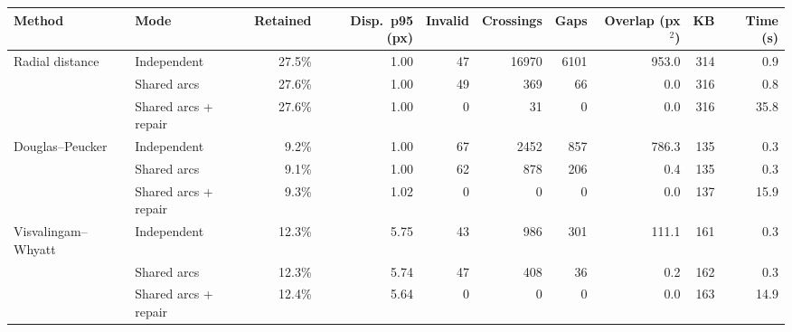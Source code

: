 \begin{tabular}{llrrrrrrrr}
\toprule
Method & Mode & Retained & Disp.\ p95 (px) & Invalid & Crossings & Gaps & Overlap (px$^2$) & KB & Time (s) \\
\midrule
Radial distance & Independent & 27.5\% & 1.00 & 47 & 16970 & 6101 & 953.0 & 314 & 0.9 \\
 & Shared arcs & 27.6\% & 1.00 & 49 & 369 & 66 & 0.0 & 316 & 0.8 \\
 & Shared arcs + repair & 27.6\% & 1.00 & 0 & 31 & 0 & 0.0 & 316 & 35.8 \\
\midrule
Douglas–Peucker & Independent & 9.2\% & 1.00 & 67 & 2452 & 857 & 786.3 & 135 & 0.3 \\
 & Shared arcs & 9.1\% & 1.00 & 62 & 878 & 206 & 0.4 & 135 & 0.3 \\
 & Shared arcs + repair & 9.3\% & 1.02 & 0 & 0 & 0 & 0.0 & 137 & 15.9 \\
\midrule
Visvalingam–Whyatt & Independent & 12.3\% & 5.75 & 43 & 986 & 301 & 111.1 & 161 & 0.3 \\
 & Shared arcs & 12.3\% & 5.74 & 47 & 408 & 36 & 0.2 & 162 & 0.3 \\
 & Shared arcs + repair & 12.4\% & 5.64 & 0 & 0 & 0 & 0.0 & 163 & 14.9 \\
\bottomrule
\end{tabular}